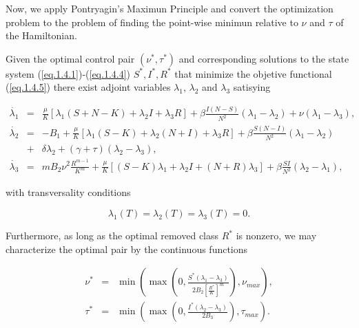 Now, we apply Pontryagin's Maximun Principle and convert the optimization problem to the problem of finding the point-wise minimun relative to $\nu$ and $\tau$ of the Hamiltonian.

\begin{theorem}
Given the optimal control pair $(\nu^*,\tau^*)$ and corresponding solutions to the state system (\ref{eq.1.4.1})-(\ref{eq.1.4.4}) $S^*,I^*,R^*$ that minimize the objetive functional (\ref{eq.1.4.5}) there exist adjoint variables $\lambda_1$, $\lambda_2$ and $\lambda_3$ satisying

\begin{eqnarray}\label{eq.1.4.adj}
\dot{\lambda_1}&=& \frac{\mu}{K}[\lambda_1(S+N-K)+\lambda_2 I+\lambda_3 R]+\beta \frac{I(N-S)}{N^2}(\lambda_1-\lambda_2)+\nu(\lambda_1-\lambda_3), \label{eq.1.4.10}\\
\dot{\lambda_2}&=& -B_1+\frac{\mu}{K}[\lambda_1(S-K)+\lambda_2(N+I)+\lambda_3 R]+\beta\frac{S(N-I)}{N^2}(\lambda_1-\lambda_2)\nonumber\\
&+&\delta \lambda_2+(\gamma+\tau)(\lambda_2-\lambda_3),\label{eq.1.4.11}\\
\dot{\lambda_3}&=& mB_2 \nu^2\frac{R^{m-1}}{K^m}+\frac{\mu}{K}[(S-K)\lambda_1 +\lambda_2 I+(N+R)\lambda_3]+\beta \frac{SI}{N^2}(\lambda_2-\lambda_1),\label{eq.1.4.12}
\end{eqnarray}

with transversality conditions

\begin{equation}\label{eq.1.4.13}
\lambda_1(T)=\lambda_2(T)=\lambda_3(T)=0.
\end{equation}

Furthermore, as long as the optimal removed class $R^*$ is nonzero, we may characterize the optimal pair by the continuous functions

\begin{eqnarray}
\nu^*&=&\min \left(\max\left(0,\frac{S^*(\lambda_1-\lambda_3)}{2B_2[\frac{R^*}{K}]^m}\right),\nu_{max}\right),\nonumber\\
\tau^*&=&\min \left(\max\left(0,\frac{I^*(\lambda_2-\lambda_3)}{2B_3}\right),\tau_{max}\right) \label{eq.1.4.14}.
\end{eqnarray}
\end{theorem}

